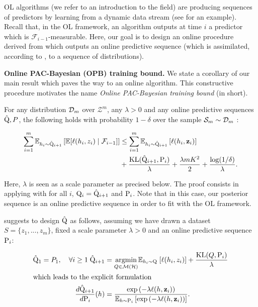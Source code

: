 OL algorithms (we refer to \citealp{hazan2016introduction}  an introduction to the field) are producing sequences of predictors by learning from a dynamic data stream (see  for an example). Recall that, in the OL framework, an algorithm outputs at time $i$ a predictor which is $\mathcal{F}_{i-1}$-measurable. Here, our goal is to design an online procedure derived from  which outputs an online predictive sequence (which is assimilated, according to , to a sequence of distributions).


\textbf{Online PAC-Bayesian (OPB) training bound.} We state a corollary of our main result which paves the way to an online algorithm. This constructive procedure motivates the name \emph{ Online PAC-Bayesian training bound} (\OPBTrain in short).

\begin{corollary}
  \label{cor: online_procedure}
  For any distribution $\Dm$ over $\mathcal{Z}^m$, any $\lambda>0$ and any online predictive sequences $\hat{\Q},P$, the following holds with probability $1-\delta$ over the sample $\Sm\sim\Dm$ :

  \begin{align*}
    \sum_{i=1}^m \mathbb{E}_{h_i\sim \hat{\Q}_{i+1}}\left[ \mathbb{E}[\ell(h_i,z_i) \mid \mathcal{F}_{i-1}]    \right] & \leq \sum_{i=1}^m \mathbb{E}_{h_i\sim \hat{\Q}_{i+1}}\left[ \ell(h_i,\z_i) \right] \\
    & + \frac{\operatorname{KL}(\hat{\Q}_{i+1}, \P_{i})}{\lambda} + \frac{\lambda m K^2}{2} + \frac{\log(1/\delta)}{\lambda}.
  \end{align*}
\end{corollary}
Here, $\lambda$ is seen as a scale parameter as precised below.
The proof consists in applying  with for all $i$, $\Q_{i}= \hat{\Q}_{i+1}$ and $\P_{i}$.
Note that in this case, our posterior sequence is an online predictive sequence in order to fit with the OL framework.


 suggests to design $\hat{\Q}$ as follows, assuming we have drawn a dataset $S= \{z_1,...,z_m\}$, fixed a scale parameter $\lambda>0$  and an online predictive sequence $\P_{i}$:

\begin{align}
  \label{eq: pacb_online_alg}
  \hat{\Q}_1= P_1, \quad \forall i\geq1\; \hat{\Q}_{i+1}&= \underset{Q\in\mathcal{M}(\mathcal{H})}{\mathrm{argmin}} \mathbb{E}_{h_i\sim \Q} \; [\ell(h_i,z_i)] + \frac{\operatorname{KL}(Q, \P_{i})}{\lambda} \\
  \intertext{which leads to the explicit formulation}
  \label{eq: catoni_formulation}
  \frac{d\hat{\Q}_{i+1}}{d\P_{i}}(h)& = \frac{\exp\left(-\lambda  \ell(h,\z_i)\right)}{\mathbb{E}_{h\sim \P_{i}}\left[\exp\left(-\lambda  \ell(h,\z_i)\right)\right]}.
\end{align}

